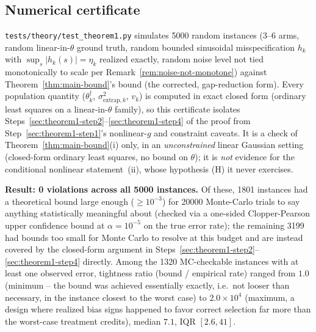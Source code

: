 \subsection{Numerical certificate}
\label{sec:theorem1-certificate}

\texttt{tests/theory/test\_theorem1.py} simulates 5000 random instances (3--6 arms,
random linear-in-$\theta$ ground truth, random bounded sinusoidal misspecification
$h_k$ with $\sup_s |h_k(s)| = \eta_k$ realized exactly, random noise level not tied
monotonically to scale per Remark~\ref{rem:noise-not-monotone}) against
Theorem~\ref{thm:main-bound}'s bound (the corrected, gap-reduction form). Every
population quantity ($\theta_k^\dagger$, $\sigma^2_{\mathrm{extrap},k}$, $v_k$) is
computed in exact closed form (ordinary least squares on a linear-in-$\theta$ family),
so this certificate isolates Steps~\ref{sec:theorem1-step2}--\ref{sec:theorem1-step4}
of the proof from Step~\ref{sec:theorem1-step1}'s nonlinear-$g$ and constraint caveats. It is a
check of Theorem~\ref{thm:main-bound}(i) only, in an \emph{unconstrained} linear Gaussian
setting (closed-form ordinary least squares, no bound on $\theta$); it is \emph{not}
evidence for the conditional nonlinear statement~(ii), whose hypothesis (H) it never
exercises.

\textbf{Result: 0 violations across all 5000 instances.} Of these, 1801 instances had a
theoretical bound large enough ($\ge 10^{-3}$) for 20000 Monte-Carlo trials to say
anything statistically meaningful about (checked via a one-sided Clopper-Pearson upper
confidence bound at $\alpha = 10^{-5}$ on the true error rate); the remaining 3199 had
bounds too small for Monte Carlo to resolve at this budget and are instead covered by
the closed-form argument in Steps~\ref{sec:theorem1-step2}--\ref{sec:theorem1-step4}
directly. Among the 1320 MC-checkable instances with at least one observed error,
tightness ratio (bound / empirical rate) ranged from $1.0$ (minimum -- the bound was
achieved essentially exactly, i.e.\ not looser than necessary, in the instance closest
to the worst case) to $2.0 \times 10^4$ (maximum, a design where realized bias signs
happened to favor correct selection far more than the worst-case treatment credits),
median $7.1$, IQR $[2.6, 41]$.
